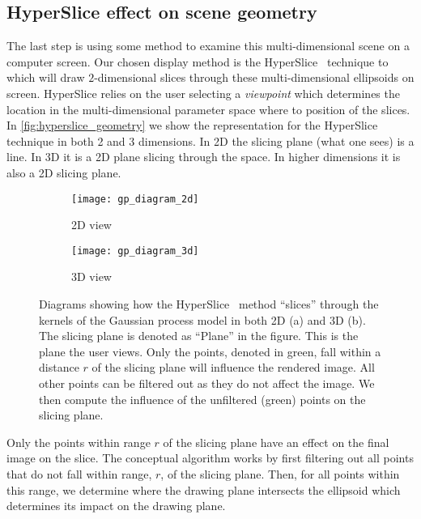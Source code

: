 \subsection{HyperSlice effect on scene geometry}
\label{sec:hypersliceeffectonscenegeometry}

The last step is using some method to examine this multi-dimensional
scene on a computer screen.  Our
chosen display method is the
HyperSlice~\cite{Wijk:1993} technique to which will draw $2$-dimensional
slices through these multi-dimensional ellipsoids on screen.  
HyperSlice relies on the user selecting a \textit{viewpoint} which 
determines the location in the multi-dimensional parameter space where to
position of the slices.
In \autoref{fig:hyperslice_geometry} we show the representation for the
HyperSlice technique in both 2 and 3 dimensions.  In 2D the slicing plane (what
one sees) is a line.  In 3D it is a 2D plane slicing through the space.  In 
higher dimensions it is also a 2D slicing plane.

\begin{figure}[htb]
  \centering
  \begin{subfigure}{0.25\textwidth}
    \centering
    \texttt{[image: gp\_diagram\_2d]}
    \caption{2D view}
    \label{fig:hs_2d}
  \end{subfigure}%
  \begin{subfigure}{0.25\textwidth}
    \centering
    \texttt{[image: gp\_diagram\_3d]}
    \caption{3D view}
    \label{fig:hs_3d}
  \end{subfigure}
  \caption[Example of 2D slices of 2D and 3D spheres]{
    Diagrams showing how the HyperSlice~\cite{Wijk:1993} method ``slices'' 
    through the 
    kernels of the Gaussian process model in both 2D (a) and 3D (b).  The 
    slicing plane is denoted as ``Plane'' in the figure.  This is the 
    plane the user views.  Only the points, denoted in green, fall within a 
    distance $r$ of the slicing
    plane will influence the rendered image.  All other points can be filtered
    out as they do not affect the image.  We then compute the influence of 
    the unfiltered (green) points on the slicing plane.
  }
  \label{fig:hyperslice_geometry}
\end{figure}


Only the points within range $r$ of the slicing plane have an effect on the
final image on the slice.
The conceptual algorithm works by first filtering out all points
that do not fall within range, $r$, of the slicing plane.  Then, for all points
within this range, we determine where the drawing plane intersects the
ellipsoid which determines its impact on the drawing plane.

